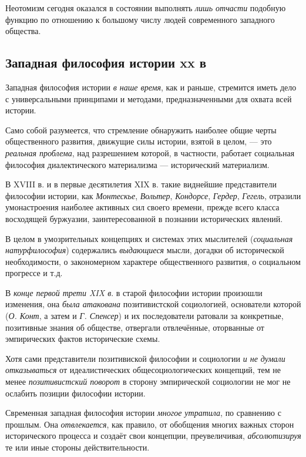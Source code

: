 \documentclass[a4paper,14pt,russian]{extreport}
\begin{document}
Неотомизм сегодня оказался в состоянии выполнять \emph{лишь отчасти} подобную функцию по отношению к большому числу людей современного западного общества.

\subsection{Западная философия истории xx в}

Западная философия истории \emph{в наше время}, как и раньше, стремится иметь дело с универсальными принципами и методами, предназначенными для охвата всей истории.

Само собой разумеется, что стремление обнаружить наиболее общие черты общественного развития, движущие силы истории, взятой в целом, --- это \emph{реальная проблема}, над разрешением которой, в частности, работает социальная философия диалектического материализма --- исторический материализм.

В XVIII в. и в первые десятилетия XIX в. такие виднейшие представители философии истории, как \emph{Монтескье}, \emph{Вольтер}, \emph{Кондорсе}, \emph{Гердер}, \emph{Гегель}, отразили умонастроения наиболее активных сил своего времени, прежде всего класса восходящей буржуазии, заинтересованной в познании исторических явлений.

В целом в умозрительных концепциях и системах этих мыслителей (\emph{социальная натурфилософия}) содержались \emph{выдающиеся} мысли, догадки об исторической необходимости, о закономерном характере общественного развития, о социальном прогрессе и т.д.

В \emph{конце первой трети XIX в}. в старой философии истории произошли изменения, она \emph{была атакована} позитивистской социологией, основатели которой (\emph{О. Конт}, а затем и \emph{Г. Спенсер}) и их последователи ратовали за конкретные, позитивные знания об обществе, отвергали отвлечённые, оторванные от эмпирических фактов исторические схемы.

Хотя сами представители позитивиской философии и социологии \emph{и не думали отказываться} от идеалистических общесоциологических концепций, тем не менее \emph{позитивистский поворот} в сторону эмпирической социологии не мог не ослабить позиции философии истории.

Свременная западная философия истории \emph{многое утратила}, по сравнению с прошлым. Она \emph{отвлекается}, как правило, от обобщения многих важных сторон исторического процесса и создаёт свои концепции, преувеличивая, \emph{абсолютизируя} те или иные стороны действительности.
\end{document}
